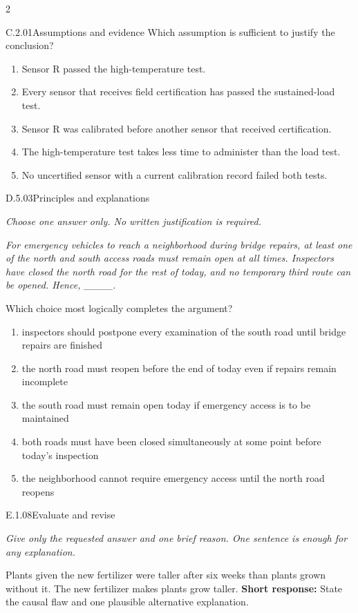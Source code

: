 \documentclass[9pt]{extarticle}
\newcommand{\choice}[1]{\item #1}
\begin{document}
\begin{multicols}{2}
\begin{DenseCoreProblem}{C.2.01}{Assumptions and evidence}
Which assumption is sufficient to justify the conclusion?
\begin{enumerate}[label=(\alph*)]
  \choice{Sensor R passed the high-temperature test.}
  \choice{Every sensor that receives field certification has passed the sustained-load test.}
  \choice{Sensor R was calibrated before another sensor that received certification.}
  \choice{The high-temperature test takes less time to administer than the load test.}
  \choice{No uncertified sensor with a current calibration record failed both tests.}
\end{enumerate}
\end{DenseCoreProblem}
\begin{DenseCoreProblem}{D.5.03}{Principles and explanations}
{\scriptsize\textit{Choose one answer only. No written justification is required.}\par}
\emph{For emergency vehicles to reach a neighborhood during bridge repairs, at least one of the north and south access roads must remain open at all times. Inspectors have closed the north road for the rest of today, and no temporary third route can be opened. Hence, \_\_\_\_.}

Which choice most logically completes the argument?
\begin{enumerate}[label=(\alph*)]
  \choice{inspectors should postpone every examination of the south road until bridge repairs are finished}
  \choice{the north road must reopen before the end of today even if repairs remain incomplete}
  \choice{the south road must remain open today if emergency access is to be maintained}
  \choice{both roads must have been closed simultaneously at some point before today's inspection}
  \choice{the neighborhood cannot require emergency access until the north road reopens}
\end{enumerate}
\end{DenseCoreProblem}
\begin{DenseCoreProblem}{E.1.08}{Evaluate and revise}
{\scriptsize\textit{Give only the requested answer and one brief reason. One sentence is enough for any explanation.}\par}
Plants given the new fertilizer were taller after six weeks than plants grown without it. The new fertilizer makes plants grow taller.
\textbf{Short response:} State the causal flaw and one plausible alternative explanation.
\end{DenseCoreProblem}
\end{multicols}
\CoreWorkArea
\FormBreak
{}
\end{document}
